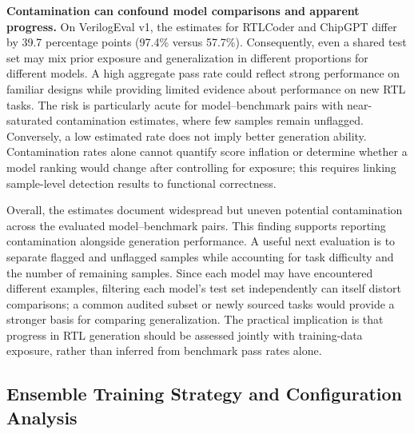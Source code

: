 \textbf{Contamination can confound model comparisons and apparent progress.}
On VerilogEval v1, the estimates for RTLCoder and ChipGPT differ by 39.7 percentage points (97.4\% versus 57.7\%). Consequently, even a shared test set may mix prior exposure and generalization in different proportions for different models. A high aggregate pass rate could reflect strong performance on familiar designs while providing limited evidence about performance on new RTL tasks. The risk is particularly acute for model--benchmark pairs with near-saturated contamination estimates, where few samples remain unflagged. Conversely, a low estimated rate does not imply better generation ability. Contamination rates alone cannot quantify score inflation or determine whether a model ranking would change after controlling for exposure; this requires linking sample-level detection results to functional correctness.

Overall, the estimates document widespread but uneven potential contamination across the evaluated model--benchmark pairs. This finding supports reporting contamination alongside generation performance. A useful next evaluation is to separate flagged and unflagged samples while accounting for task difficulty and the number of remaining samples. Since each model may have encountered different examples, filtering each model's test set independently can itself distort comparisons; a common audited subset or newly sourced tasks would provide a stronger basis for comparing generalization. The practical implication is that progress in RTL generation should be assessed jointly with training-data exposure, rather than inferred from benchmark pass rates alone.










\subsection{Ensemble Training Strategy and Configuration Analysis}
\label{sec:ablation}

